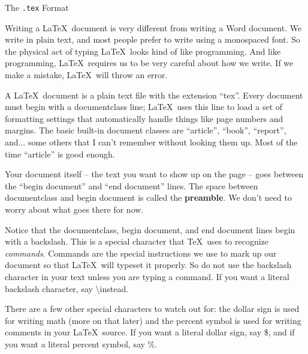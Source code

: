 \documentclass{article}
\begin{document}
\begin{center}
\Large The \texttt{.tex} Format
\end{center}

Writing a \LaTeX\ document is very different from writing a Word document. We write in plain text, and most people prefer to write using a monospaced font. So the physical act of typing \LaTeX\ looks kind of like programming. And like programming, \LaTeX\ requires us to be very careful about how we write. If we make a mistake, \LaTeX\ will throw an error.

A \LaTeX\ document is a plain text file with the extension ``tex''. Every document must begin with a documentclass line; \LaTeX\ uses this line to load a set of formatting settings that automatically handle things like page numbers and margins. The basic built-in document classes are ``article'', ``book'', ``report'', and... some others that I can't remember without looking them up. Most of the time ``article'' is good enough.

Your document itself -- the text you want to show up on the page -- goes between the ``begin document'' and ``end document'' lines. The space between documentclass and begin document is called the \textbf{preamble}. We don't need to worry about what goes there for now.

Notice that the documentclass, begin document, and end document lines begin with a backslash. This is a special character that \TeX\ uses to recognize \emph{commands}. Commands are the special instructions we use to mark up our document so that \LaTeX\ will typeset it properly. So do not use the backslash character in your text unless you are typing a command. If you want a literal backslash character, say \textbackslash instead.

There are a few other special characters to watch out for: the dollar sign is used for writing math (more on that later) and the percent symbol is used for writing comments in your \LaTeX\ source. If you want a literal dollar sign, say \$, and if you want a literal percent symbol, say \%.
\end{document}
